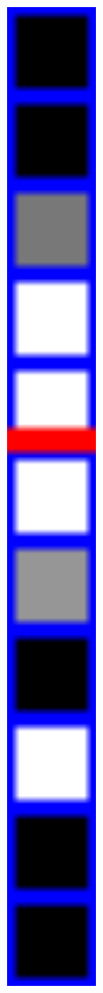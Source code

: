 \documentclass[a4paper,10pt]{scrartcl}
\begin{document}
\begin{minipage}{\textwidth}
\begin{minipage}{0.04\textwidth}
\includegraphics[width=0.65\textwidth]{include/line_detect_sum.png}
\end{minipage}
\end{minipage}
\end{document}
